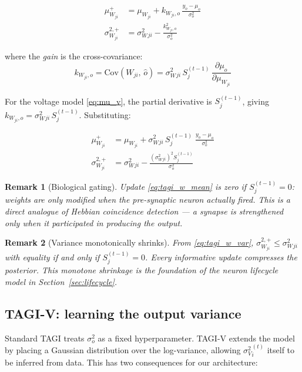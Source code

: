 \documentclass[12pt, a4paper]{article}
\newtheorem{remark}{Remark}[section]
\newcommand{\Cov}{\mathrm{Cov}}
\newcommand{\mW}{\mu_{W}}
\newcommand{\sW}{\sigma^{2}_{W}}
\newcommand{\sV}{\sigma^{2}_{V}}
\newcommand{\mupost}{\mu^{+}}
\newcommand{\sigpost}{\sigma^{2,+}}
\begin{document}
\begin{align}
    \mupost_{W_{ji}} &= \mW_{ji} + k_{W_{ji},o}\,\frac{y_o - \mu_o}{\sigma^2_o} \label{eq:tagi_mean} \\[4pt]
    \sigpost_{W_{ji}} &= \sW_{ji} - \frac{k_{W_{ji},o}^2}{\sigma^2_o} \label{eq:tagi_var}
\end{align}

where the \emph{gain} is the cross-covariance:
\begin{equation}
    k_{W_{ji},o} = \Cov(W_{ji},\, \hat{o})
    = \sW_{ji}\, S_j^{(t-1)}\, \frac{\partial \mu_o}{\partial \mW_{ji}}
    \label{eq:gain}
\end{equation}

For the voltage model \eqref{eq:mu_v}, the partial derivative is $S_j^{(t-1)}$,
giving $k_{W_{ji},o} = \sW_{ji}\, S_j^{(t-1)}$. Substituting:

\begin{align}
    \mupost_{W_{ji}} &= \mW_{ji}
        + \sW_{ji}\, S_j^{(t-1)}\;\frac{y_o - \mu_o}{\sigma^2_o}
        \label{eq:tagi_w_mean}\\[4pt]
    \sigpost_{W_{ji}} &= \sW_{ji}
        - \frac{\left(\sW_{ji}\right)^2 S_j^{(t-1)}}{\sigma^2_o}
        \label{eq:tagi_w_var}
\end{align}

\begin{remark}[Biological gating]
Update \eqref{eq:tagi_w_mean} is zero if $S_j^{(t-1)} = 0$: weights are only modified
when the pre-synaptic neuron actually fired. This is a direct analogue of
\emph{Hebbian coincidence detection} --- a synapse is strengthened only when it
participated in producing the output.
\end{remark}

\begin{remark}[Variance monotonically shrinks]
From \eqref{eq:tagi_w_var}, $\sigpost_{W_{ji}} \leq \sW_{ji}$ with equality if and only
if $S_j^{(t-1)} = 0$. Every informative update compresses the posterior. This monotone
shrinkage is the foundation of the neuron lifecycle model in
Section~\ref{sec:lifecycle}.
\end{remark}

\subsection{TAGI-V: learning the output variance}

Standard TAGI treats $\sigma^2_o$ as a fixed hyperparameter. TAGI-V \citep{nguyen2022tagi}
extends the model by placing a Gaussian distribution over the log-variance, allowing
$\sV_i^{(t)}$ itself to be inferred from data. This has two consequences for our
architecture:
\end{document}
